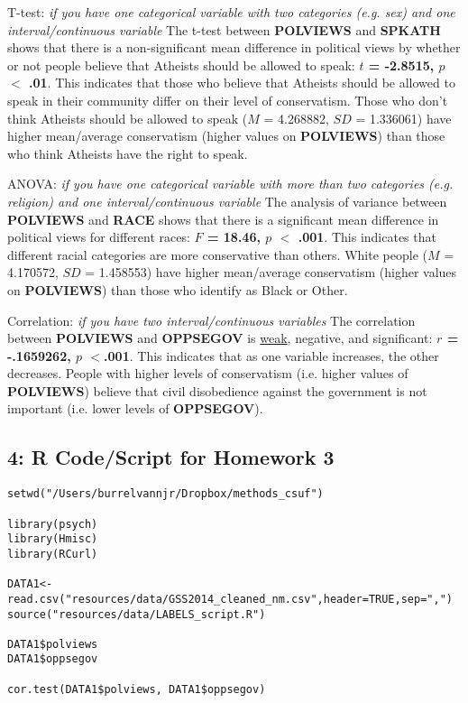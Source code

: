 \documentclass{article}
\begin{document}
T-test: {\it{if you have one categorical variable with two categories (e.g. sex) and one interval/continuous variable}} \newline \newline
The t-test between \textbf{POLVIEWS} and \textbf{SPKATH} shows that there is a non-significant mean difference in political views by whether or not people believe that Atheists should be allowed to speak: \textbf{$t$ = -2.8515, $p$ $< $ .01}. This indicates that those who believe that Atheists should be allowed to speak in their community differ on their level of conservatism. Those who don't think Atheists should be allowed to speak ($M$ = 4.268882, $SD$ = 1.336061) have higher mean/average conservatism (higher values on \textbf{POLVIEWS}) than those who think Atheists have the right to speak.\newline

ANOVA: {\it{if you have one categorical variable with more than two categories (e.g. religion) and one interval/continuous variable}} \newline \newline
The analysis of variance between \textbf{POLVIEWS} and \textbf{RACE} shows that there is a significant mean difference in political views for different races: \textbf{$F$ = 18.46, $p$ $< $ .001}. This indicates that different racial categories are more conservative than others. White people ($M$ = 4.170572, $SD$ = 1.458553) have higher mean/average conservatism (higher values on \textbf{POLVIEWS}) than those who identify as Black or Other.\newline

Correlation: {\it{if you have two interval/continuous variables}} \newline \newline
The correlation between \textbf{POLVIEWS} and \textbf{OPPSEGOV} is \href{http://www.psychology.emory.edu/clinical/bliwise/Tutorials/SCATTER/scatterplots/effect.htm}{weak}, negative, and significant: \textbf{$r$ = -.1659262, $p$ $< $.001}. This indicates that as one variable increases, the other decreases. People with higher levels of conservatism (i.e. higher values of \textbf{POLVIEWS}) believe that civil disobedience against the government is not important (i.e. lower levels of \textbf{OPPSEGOV}).\newline

\newpage

\subsection*{4: R Code/Script for Homework 3}
\begin{verbatim}
setwd("/Users/burrelvannjr/Dropbox/methods_csuf")

library(psych)
library(Hmisc)
library(RCurl)

DATA1<-read.csv("resources/data/GSS2014_cleaned_nm.csv",header=TRUE,sep=",")
source("resources/data/LABELS_script.R")

DATA1$polviews
DATA1$oppsegov

cor.test(DATA1$polviews, DATA1$oppsegov)

\end{verbatim}
\end{document}
